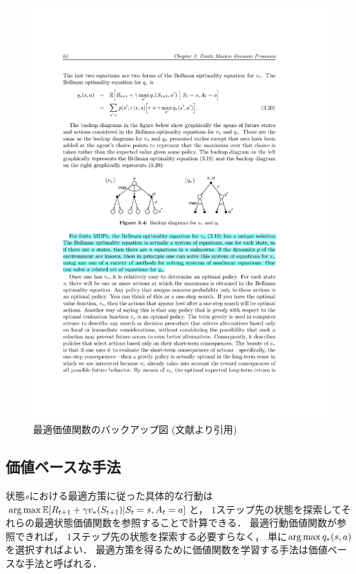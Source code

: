\begin{figure}[h]
  \centering
  \includegraphics[width=\linewidth{}]{figures/backup.pdf}
  \caption{最適価値関数のバックアップ図 (文献\cite{Sutton1998}より引用)}
  \label{fig:backup}
\end{figure}

\subsection{価値ベースな手法}
状態$s$における最適方策に従った具体的な行動は$\operatorname*{arg\,max} \mathbb{E}[R_{t+1} + \gamma v_*(S_{t+1}) | S_t=s, A_t=a]$と， $1$ステップ先の状態を探索してそれらの最適状態価値関数を参照することで計算できる．
最適行動価値関数が参照できれば， $1$ステップ先の状態を探索する必要すらなく， 単に$\operatorname*{arg\,max} q_*(s, a)$を選択すればよい．
最適方策を得るために価値関数を学習する手法は価値ベースな手法と呼ばれる．

